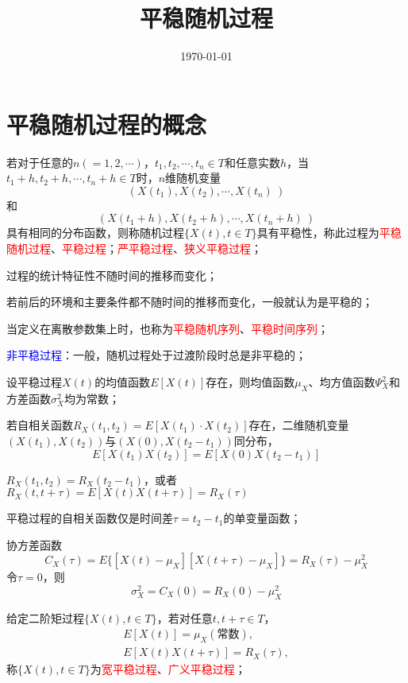 \documentclass[12pt,a4paper]{article}
\title{平稳随机过程}
\author{}
\date{\today}
\begin{document}
\maketitle

\section{平稳随机过程的概念}
若对于任意的$n(= 1, 2, \cdots)$，$t_1, t_2, \cdots, t_n \in T$和任意实数$h$，当$t_1 +h, t_2 +h, \cdots, t_n +h \in T$时，$n$维随机变量
\begin{equation}
(X(t_1), X(t_2), \cdots, X(t_n)~)
\end{equation}
和
\begin{equation}
(X(t_1+h), X(t_2+h), \cdots, X(t_n+h)~)
\end{equation}
具有相同的分布函数，则称随机过程$\{X(t), t\in T\}$具有平稳性，称此过程为\textcolor{red}{平稳随机过程}、\textcolor{red}{平稳过程}；\textcolor{red}{严平稳过程}、\textcolor{red}{狭义平稳过程}；

过程的统计特征性不随时间的推移而变化；

若前后的环境和主要条件都不随时间的推移而变化，一般就认为是平稳的；

当定义在离散参数集上时，也称为\textcolor{red}{平稳随机序列}、\textcolor{red}{平稳时间序列}；

\textcolor{blue}{非平稳过程}：一般，随机过程处于过渡阶段时总是非平稳的；

设平稳过程$X(t)$的均值函数$E[X(t)]$存在，则均值函数$\mu_X$、均方值函数$\Psi^2_X$和方差函数$\sigma^2_X$均为常数；

若自相关函数$R_X(t_1, t_2) = E[X(t_1)\cdot X(t_2)]$存在，二维随机变量$(X(t_1), X(t_2) )$与$(X(0), X(t_2-t_1) )$同分布，
\begin{equation}
E[X(t_1)X(t_2)] = E[X(0)X(t_2-t_1)] 
\end{equation}

$R_X(t_1,t_2) = R_X(t_2-t_1)$，或者$R_X(t,t+\tau) = E[X(t)X(t+\tau)]  = R_X(\tau)$

平稳过程的自相关函数仅是时间差$\tau = t_2-t_1$的单变量函数；

协方差函数
\begin{equation}
C_X(\tau) = E\{[X(t)-\mu_X][X(t+\tau)-\mu_X] \} = R_X(\tau) -\mu_X^2
\end{equation}
令$\tau = 0$，则
\begin{equation}
\sigma_X^2 = C_X(0) = R_X(0) -\mu_X^2
\end{equation}

给定二阶矩过程$\{X(t), t \in T\}$，若对任意$t, t+\tau \in T$，
\begin{eqnarray}
\nonumber E[X(t)] = \mu_X(\text{常数}), \\
E[X(t)X(t+\tau)] = R_X(\tau), 
\end{eqnarray}
称$\{X(t), t \in T\}$为\textcolor{red}{宽平稳过程}、\textcolor{red}{广义平稳过程}；
\end{document}
